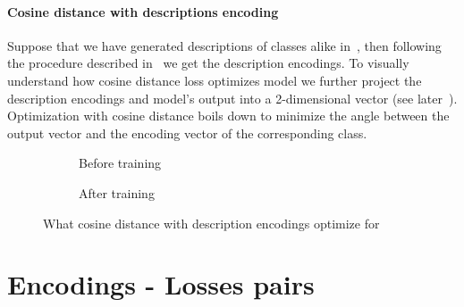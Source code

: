 \paragraph{Cosine distance with descriptions encoding} Suppose that we have generated descriptions of classes alike in~, then following the procedure described in~ we get the description encodings.
To visually understand how cosine distance loss optimizes model we further project the description encodings and model's output into a 2-dimensional vector (see later~). Optimization with cosine distance boils down to minimize the angle between the output vector and the encoding vector of the corresponding class.
\begin{figure}[htbp]
  \begin{subfigure}{0.45\textwidth}
    \caption{Before training}
    \label{fig:03/cd-desc-before}
  \end{subfigure}
  \begin{subfigure}{0.45\textwidth}
    \caption{After training}
    \label{fig:03/cd-desc-after}
  \end{subfigure}
  \caption{What cosine distance with description encodings optimize for} %
\end{figure}

\section{Encodings - Losses pairs}
\label{sec:encodings-losses-pairs}

